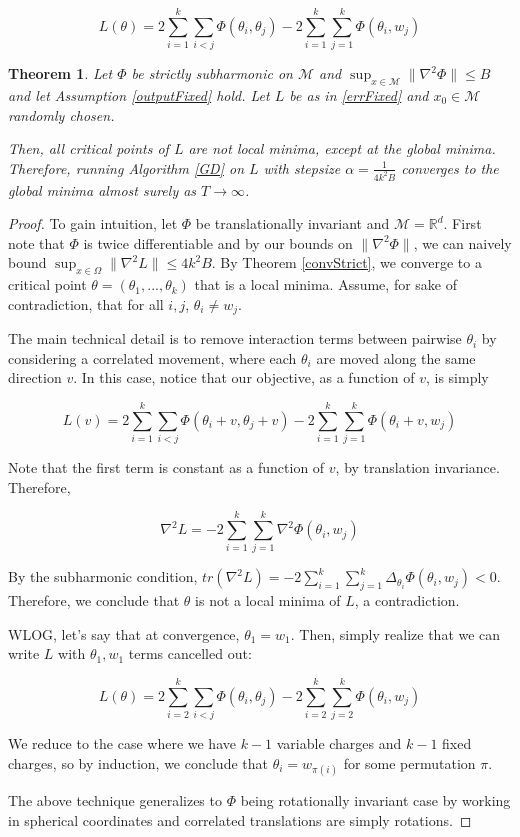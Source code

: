 \documentclass[11pt]{article}
\newtheorem{theorem}{Theorem}[section]
\newcommand{\R}{{\mathbb{R}}}
\begin{document}
\begin{equation}\label{errFixed}
L(\theta) =  2\sum_{i=1}^k\sum_{i < j} \Phi(\theta_i,\theta_j) - 2\sum_{i=1}^k\sum_{j=1}^k\Phi(\theta_i,w_j)
\end{equation}


\begin{theorem}
Let $\Phi$ be strictly subharmonic on $\mathcal{M}$ and $\sup_{x \in \mathcal{M}} \|\nabla^2 \Phi\|\leq B$ and let Assumption \ref{outputFixed} hold. Let $L$ be as in \eqref{errFixed} and $x_0 \in \mathcal{M}$ randomly chosen. 

Then, all critical points of $L$ are not local minima, except at the global minima. Therefore, running Algorithm \ref{GD} on $L$ with stepsize $\alpha = \frac{1}{4k^2B}$ converges to the global minima almost surely as $T\to\infty$.
\end{theorem}

\begin{proof}
To gain intuition, let $\Phi$ be translationally invariant and $\mathcal{M} = \R^d$. First note that $\Phi$ is twice differentiable and by our bounds on $\|\nabla^2\Phi\|$, we can naively bound $\sup_{x\in\Omega}\|\nabla^2L\|\leq 4k^2B$. By Theorem \ref{convStrict}, we converge to a critical point $\theta = (\theta_1,...,\theta_k)$ that is a local minima. Assume, for sake of contradiction, that for all $i, j$, $\theta_i \neq w_j$. 

The main technical detail is to remove interaction terms between pairwise $\theta_i$ by considering a correlated movement, where each $\theta_i$ are moved along the same direction $v$. In this case, notice that our objective, as a function of $v$, is simply

\[L(v) =  2\sum_{i=1}^k\sum_{i < j} \Phi(\theta_i+v,\theta_j+v) - 2\sum_{i=1}^k\sum_{j=1}^k \Phi(\theta_i+v,w_j)
 \]

Note that the first term is constant as a function of $v$, by translation invariance. Therefore,

\[\nabla^2 L = -2\sum_{i=1}^k \sum_{j=1}^k \nabla^2\Phi(\theta_i, w_j)\]

By the subharmonic condition, $tr(\nabla^2L) = -2\sum_{i=1}^k\sum_{j=1}^k \Delta_{\theta_i}\Phi(\theta_i,w_j) < 0$. Therefore, we conclude that $\theta$ is not a local minima of $L$, a contradiction.

WLOG, let's say that at convergence, $\theta_1 = w_1$. Then, simply realize that we can write $L$ with $\theta_1,w_1$ terms cancelled out:

\[L(\theta) =  2\sum_{i=2}^k\sum_{i < j} \Phi(\theta_i,\theta_j) - 2\sum_{i=2}^k\sum_{j=2}^k\Phi(\theta_i,w_j) \]

We reduce to the case where we have $k-1$ variable charges and $k-1$ fixed charges, so by induction, we conclude that $\theta_i = w_{\pi(i)}$ for some permutation $\pi$.

The above technique generalizes to $\Phi$ being rotationally invariant case by working in spherical coordinates and correlated translations are simply rotations. 
\end{proof}
\end{document}

